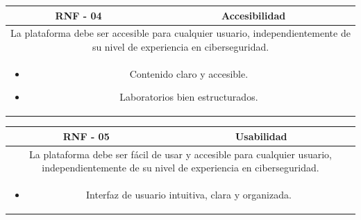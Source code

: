             \begin{table}[!htbp]
                \centering
                \begin{tabular}{|c|c|}
                    \hline
                    \textbf{RNF - 04} & \textbf{Accesibilidad} \\
                    \hline
                    \multicolumn{2}{|p{15cm}|}{
                        La plataforma debe ser accesible para cualquier usuario, independientemente de su nivel de experiencia en ciberseguridad.
                    } \\
                    \hline
                    \multicolumn{2}{|p{15cm}|}{
                        \begin{itemize}
                            \item Contenido claro y accesible.
                            \item Laboratorios bien estructurados.
                        \end{itemize}
                        } \\
                    \hline
                \end{tabular}
                \label{tab:RNF4}
            \end{table}
            
            \begin{table}[!htbp]
                \centering
                \begin{tabular}{|c|c|}
                    \hline
                    \textbf{RNF - 05} & \textbf{Usabilidad} \\
                    \hline
                    \multicolumn{2}{|p{15cm}|}{
                        La plataforma debe ser fácil de usar y accesible para cualquier usuario, independientemente de su nivel de experiencia en ciberseguridad.
                    } \\
                    \hline
                    \multicolumn{2}{|p{15cm}|}{
                        \begin{itemize}
                            \item Interfaz de usuario intuitiva, clara y organizada.
                        \end{itemize}
                        } \\
                    \hline
                \end{tabular}
                \label{tab:RNF5}
            \end{table}
            
